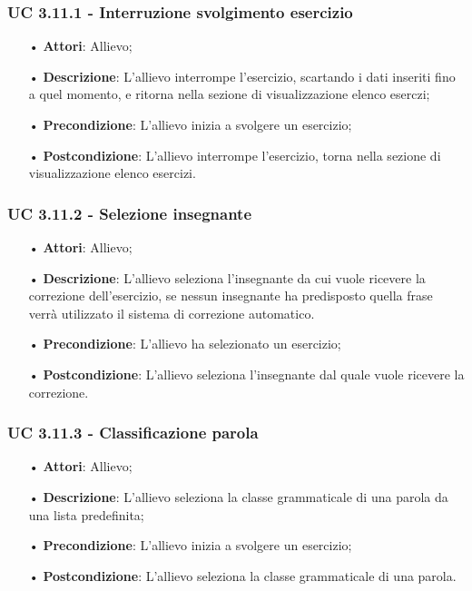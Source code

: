 \subsubsection{UC 3.11.1 - Interruzione svolgimento esercizio}
\begin{itemize}
	\item[•]\textbf{Attori}: Allievo;
	\item[•]\textbf{Descrizione}: L'allievo interrompe  l'esercizio, scartando i dati inseriti fino a quel momento, e ritorna nella sezione di visualizzazione elenco eserczi;
	\item[•]\textbf{Precondizione}: L'allievo inizia a svolgere un esercizio;
	\item[•]\textbf{Postcondizione}: L'allievo interrompe l'esercizio, torna nella sezione di visualizzazione elenco esercizi.
\end{itemize}

\subsubsection{UC 3.11.2 - Selezione insegnante}
\begin{itemize}
	\item[•]\textbf{Attori}: Allievo;
	\item[•]\textbf{Descrizione}: L'allievo seleziona l'insegnante da cui vuole ricevere la correzione dell'esercizio, se nessun insegnante ha predisposto quella frase verrà utilizzato il sistema di correzione automatico. %
	\item[•]\textbf{Precondizione}: L'allievo ha selezionato un esercizio;
	\item[•]\textbf{Postcondizione}: L'allievo seleziona l'insegnante dal quale vuole ricevere la correzione.
\end{itemize}

\subsubsection{UC 3.11.3 - Classificazione parola}
\begin{itemize}
	\item[•]\textbf{Attori}: Allievo;
	\item[•]\textbf{Descrizione}: L'allievo seleziona la classe grammaticale di una parola da una lista predefinita;
	\item[•]\textbf{Precondizione}: L'allievo inizia a svolgere un esercizio;
	\item[•]\textbf{Postcondizione}: L'allievo seleziona la classe grammaticale di una parola.
\end{itemize}



